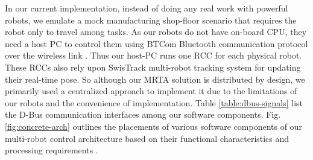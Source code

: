 \documentclass[journal]{IEEEtran}
\begin{document}
In our current implementation, instead of doing any real work with powerful robots, we emulate a mock manufacturing shop-floor scenario that requires the robot only to travel among tasks. As our robots do not have on-board CPU, they need a host PC to  control them using BTCom Bluetooth communication protocol over the wireless link \cite{Mondada+2009}. Thus our host-PC runs one RCC for each physical robot. These RCCs also rely upon SwisTrack multi-robot tracking system for updating their real-time pose. So although our MRTA solution is distributed by design, we primarily used a centralized approach to implement it due to the limitations of our robots and the convenience of implementation. Table \ref{table:dbus-signals} list the D-Bus communication interfaces among our software components. Fig. \ref{fig:concrete-arch} outlines the placements of various software components of our multi-robot control architecture based on their functional characteristics and processing requirements \cite{Sarker2010control}.
\end{document}
